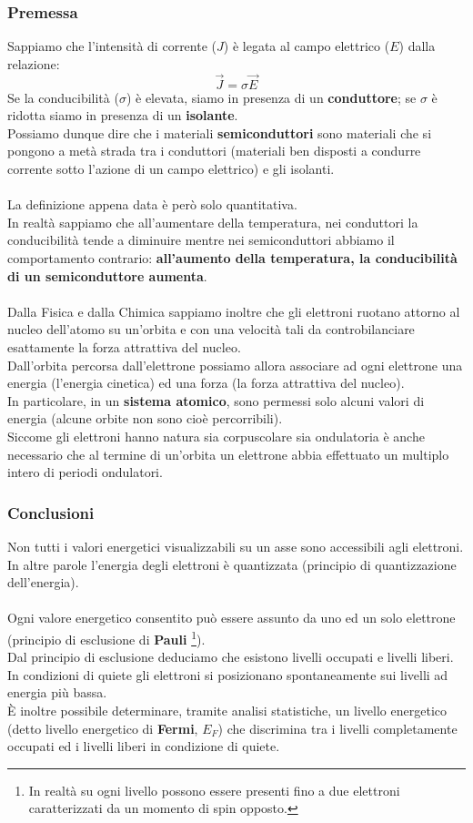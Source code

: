 \documentclass[../main.tex]{subfiles}
\begin{document}
	\subsubsection{Premessa}
	Sappiamo che l’intensità di corrente ($J$) è legata al campo elettrico ($E$) dalla relazione:
	$$\vec{J} = \sigma \vec{E}$$
	Se la conducibilità ($\sigma$) è elevata, siamo in presenza di un \textbf{conduttore}; se $\sigma$ è ridotta siamo in presenza di un \textbf{isolante}.\\
	Possiamo dunque dire che i materiali \textbf{semiconduttori} sono materiali che si pongono a metà strada tra i conduttori (materiali ben disposti a condurre corrente sotto l’azione di un campo elettrico) e gli isolanti.\\\\
	La definizione appena data è però solo quantitativa. \\
	In realtà sappiamo che all’aumentare della temperatura, nei conduttori la conducibilità tende a diminuire mentre nei semiconduttori abbiamo il comportamento contrario: \textbf{all’aumento della temperatura, la conducibilità di un semiconduttore aumenta}.\\\\
	Dalla Fisica e dalla Chimica sappiamo inoltre che gli elettroni ruotano attorno al nucleo dell’atomo su un’orbita e con una velocità tali da controbilanciare esattamente la forza attrattiva del nucleo.\\
	Dall’orbita percorsa dall’elettrone possiamo allora associare ad ogni elettrone una energia (l’energia cinetica) ed una forza (la forza attrattiva del nucleo).\\
	In particolare, in un \textbf{sistema atomico}, sono permessi solo alcuni valori di energia (alcune orbite non sono cioè percorribili).\\
	Siccome gli elettroni hanno natura sia corpuscolare sia ondulatoria è anche necessario che al termine di un’orbita un elettrone abbia effettuato un multiplo intero di periodi ondulatori.
	\subsubsection{Conclusioni}
	Non tutti i valori energetici visualizzabili su un asse sono accessibili agli elettroni.\\
	In altre parole l’energia degli elettroni è quantizzata (principio di quantizzazione dell’energia).\\\\
	Ogni valore energetico consentito può essere assunto da uno ed un solo elettrone (principio di esclusione di \textbf{Pauli} \footnote{In realtà su ogni livello possono essere presenti fino a due elettroni caratterizzati da un momento di spin opposto.}).\\
	Dal principio di esclusione deduciamo che esistono livelli occupati e livelli liberi.\\
	In condizioni di quiete gli elettroni si posizionano spontaneamente sui livelli ad energia più bassa.\\
	È inoltre possibile determinare, tramite analisi statistiche, un livello energetico (detto livello energetico di \textbf{Fermi}, $E_F$) che discrimina tra i livelli completamente occupati ed i livelli liberi in condizione di quiete.
\end{document}
